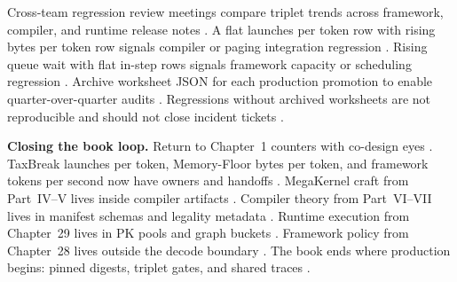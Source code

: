 Cross-team regression review meetings compare triplet trends across framework, compiler, and runtime release notes \citep{patel2025llminference,yirage2026,chen2020compilerbasedhardw,kwon2023vllm,taxbreak2026,memoryfloor2026,dlbook}. A flat launches per token row with rising bytes per token row signals compiler or paging integration regression \citep{memoryfloor2026,taxbreak2026,yirage2026,chen2020compilerbasedhardw,patel2025llminference,kwon2023vllm,dlbook}. Rising queue wait with flat in-step rows signals framework capacity or scheduling regression \citep{patel2025llminference,kwon2023vllm,yirage2026,chen2020compilerbasedhardw,dlbook}. Archive worksheet JSON for each production promotion to enable quarter-over-quarter audits \citep{yirage2026,chen2020compilerbasedhardw,patel2025llminference,dlbook}. Regressions without archived worksheets are not reproducible and should not close incident tickets \citep{patel2025llminference,yirage2026,chen2020compilerbasedhardw,kwon2023vllm,dlbook}.

\textbf{Closing the book loop.} Return to Chapter~1 counters with co-design eyes \citep{patel2025llminference,taxbreak2026,memoryfloor2026,yirage2026,chen2020compilerbasedhardw,dlbook}. TaxBreak launches per token, Memory-Floor bytes per token, and framework tokens per second now have owners and handoffs \citep{taxbreak2026,memoryfloor2026,kwon2023vllm,patel2025llminference,yirage2026,chen2020compilerbasedhardw,dlbook}. MegaKernel craft from Part~IV--V lives inside compiler artifacts \citep{chen2020compilerbasedhardw,yirage2026,dao2022flashattention,patel2025llminference,dlbook}. Compiler theory from Part~VI--VII lives in manifest schemas and legality metadata \citep{chen2020compilerbasedhardw,yirage2026,patel2025llminference,dlbook}. Runtime execution from Chapter~29 lives in PK pools and graph buckets \citep{yirage2026,nvidia2024cudagraphs,chen2020compilerbasedhardw,patel2025llminference,memoryfloor2026,taxbreak2026,dlbook}. Framework policy from Chapter~28 lives outside the decode boundary \citep{kwon2023vllm,patel2025llminference,yirage2026,chen2020compilerbasedhardw,dlbook}. The book ends where production begins: pinned digests, triplet gates, and shared traces \citep{yirage2026,chen2020compilerbasedhardw,patel2025llminference,kwon2023vllm,taxbreak2026,memoryfloor2026,dlbook}.

